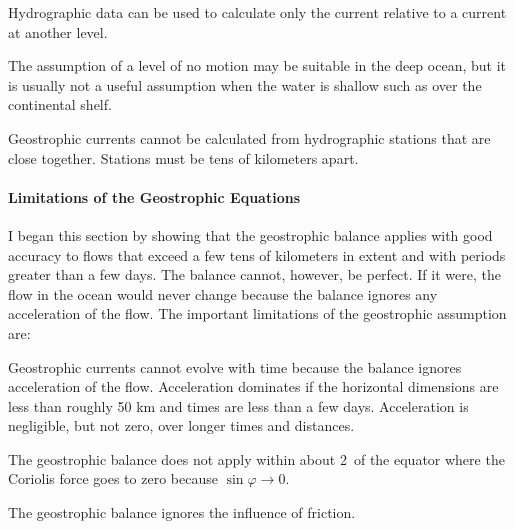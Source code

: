 \begin{enumerate}
\vitem Hydrographic data can be used to calculate only the current relative to a
current at another level.

\vitem The assumption of a level of no motion may be suitable in the
deep ocean, but it is usually not a useful assumption when the water
is shallow such as over the continental shelf.

\vitem Geostrophic currents cannot be calculated from hydrographic
stations that are
close together. Stations must be tens of kilometers apart.

\end{enumerate}

\paragraph{Limitations of the Geostrophic Equations}
I began this
section by showing that the
geostrophic balance applies with good
accuracy to flows that exceed a
few tens of kilometers in extent and with periods greater than a few
days. The balance cannot, however, be perfect.  If it were, the flow
in the ocean would never change because the balance ignores any
acceleration of the flow. The important limitations of the geostrophic
assumption are:

\begin{enumerate}
\vitem Geostrophic currents
cannot evolve with time because the balance ignores acceleration of
the flow. Acceleration dominates if the horizontal dimensions are less
than roughly 50 km and times are less than a few days. Acceleration is
negligible, but not zero, over longer times and distances.

\vitem The geostrophic balance does not apply within about 2\degrees\ of the equator where
the Coriolis force goes to zero because $\sin \varphi \rightarrow 0$.

\vitem The geostrophic balance ignores the influence of friction.
\end{enumerate}

